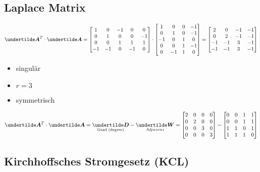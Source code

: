 \subsection{Laplace Matrix}
\begin{align*}
\ma{A}^T\cdot\ma{A} = \begin{bmatrix}
1 & 0 & -1 & 0 & 0\\ 
0 & 1 & 0 & 0 & -1 \\ 
0 & 0 & 1 & 1 & 1 \\ 
-1 & -1 & 0 & -1 & 0
\end{bmatrix}\cdot\begin{bmatrix}
1 & 0 & 0 & -1 \\ 
0 & 1 & 0 & -1 \\ 
-1 & 0 & 1 & 0 \\ 
0 & 0 & 1 & -1 \\ 
0 & -1 & 1 & 0
\end{bmatrix} = \begin{bmatrix}
2 & 0 & -1 & -1 \\ 
0 & 2 & -1 & -1 \\ 
-1 & -1 & 3 & -1 \\ 
-1 & -1 & 3 & -1
\end{bmatrix}  
\end{align*}
\begin{itemize}
\item singulär
\item $r = 3$
\item symmetrisch
\end{itemize}
\begin{align*}
\ma{A}^T\cdot\ma{A} = \underset{\text{Grad (degree)}}{\ma{D}} - \underset{Adjazenz}{\ma{W}} = \begin{bmatrix}
2 & 0 & 0 & 0 \\ 
0 & 2 & 0 & 0 \\ 
0 & 0 & 3 & 0 \\ 
0 & 0 & 0 & 3
\end{bmatrix} - \begin{bmatrix}
0 & 0 & 1 & 1 \\ 
0 & 0 & 1 & 1 \\ 
1 & 1 & 0 & 1 \\ 
1 & 1 & 1 & 0
\end{bmatrix} 
\end{align*}

\subsection{Kirchhoffsches Stromgesetz (KCL)}

